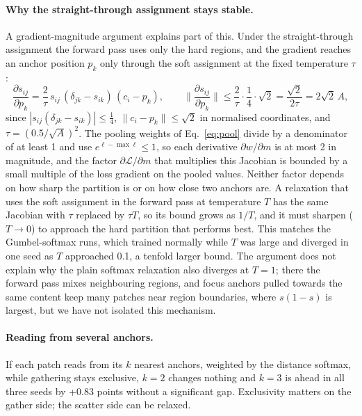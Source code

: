 \documentclass[runningheads]{llncs}
\begin{document}
\paragraph{Why the straight-through assignment stays stable.} A gradient-magnitude argument
explains part of this. Under the straight-through assignment the forward pass uses only the
hard regions, and the gradient reaches an anchor position $p_k$ only through the soft
assignment at the fixed temperature $\tau$:
\begin{equation}
\frac{\partial s_{ij}}{\partial p_k}=\frac{2}{\tau}\,s_{ij}\,(\delta_{jk}-s_{ik})\,(c_i-p_k),
\qquad
\Big\|\frac{\partial s_{ij}}{\partial p_k}\Big\|\le\frac{2}{\tau}\cdot\frac14\cdot\sqrt2
=\frac{\sqrt2}{2\tau}=2\sqrt2\,A ,
\label{eq:stbound}
\end{equation}
since $|s_{ij}(\delta_{jk}-s_{ik})|\le\frac14$, $\|c_i-p_k\|\le\sqrt2$ in normalised
coordinates, and $\tau=(0.5/\sqrt A)^2$. The pooling weights of Eq.~\ref{eq:pool} divide by a
denominator of at least 1 and use $e^{\ell-\max\ell}\le1$, so each derivative
$\partial w/\partial m$ is at most 2 in magnitude, and the factor $\partial\mathcal{L}/\partial m$
that multiplies this Jacobian is bounded by a small multiple of the loss gradient on the pooled
values. Neither factor depends
on how sharp the partition is or on how close two anchors are. A relaxation that uses the soft
assignment in the forward pass at temperature $T$ has the same Jacobian with $\tau$ replaced by
$\tau T$, so its bound grows as $1/T$, and it must sharpen ($T\to0$) to approach the hard
partition that performs best. This matches the Gumbel-softmax runs, which trained normally
while $T$ was large and diverged in one seed as $T$ approached 0.1, a tenfold larger bound. The
argument does not explain why the plain softmax relaxation also diverges at $T=1$; there the
forward pass mixes neighbouring regions, and focus anchors pulled towards the same content keep
many patches near region boundaries, where $s(1-s)$ is largest, but we have not isolated this
mechanism.

\paragraph{Reading from several anchors.} If each patch reads from its $k$ nearest anchors,
weighted by the distance softmax, while gathering stays exclusive, $k=2$ changes nothing and
$k=3$ is ahead in all three seeds by +0.83 points without a significant gap. Exclusivity matters
on the gather side; the scatter side can be relaxed.
\end{document}
